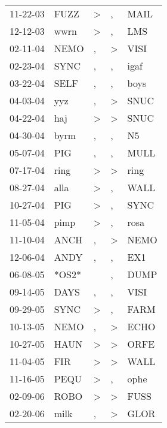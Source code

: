 \begin{supertabular}{lllll}
 11-22-03 &   FUZZ &     \textgreater &                , &   MAIL \\
 12-12-03 &   wwrn &     \textgreater &                , &    LMS \\
 02-11-04 &   NEMO &                , &     \textgreater &   VISI \\
 02-23-04 &   SYNC &                , &                , &   igaf \\
 03-22-04 &   SELF &                , &                , &   boys \\
 04-03-04 &    yyz &                , &     \textgreater &   SNUC \\
 04-22-04 &    haj &     \textgreater &     \textgreater &   SNUC \\
 04-30-04 &   byrm &                , &                , &     N5 \\
 05-07-04 &    PIG &                , &                , &   MULL \\
 07-17-04 &   ring &     \textgreater &     \textgreater &   ring \\
 08-27-04 &   alla &     \textgreater &                , &   WALL \\
 10-27-04 &    PIG &     \textgreater &                , &   SYNC \\
 11-05-04 &   pimp &     \textgreater &                , &   rosa \\
 11-10-04 &   ANCH &                , &     \textgreater &   NEMO \\
 12-06-04 &   ANDY &                , &                , &    EX1 \\
 06-08-05 &  *OS2* &                  &                , &   DUMP \\
 09-14-05 &   DAYS &                , &                , &   VISI \\
 09-29-05 &   SYNC &     \textgreater &                , &   FARM \\
 10-13-05 &   NEMO &                , &     \textgreater &   ECHO \\
 10-27-05 &   HAUN &     \textgreater &     \textgreater &   ORFE \\
 11-04-05 &    FIR &     \textgreater &     \textgreater &   WALL \\
 11-16-05 &   PEQU &     \textgreater &                , &   ophe \\
 02-09-06 &   ROBO &     \textgreater &     \textgreater &   FUSS \\
 02-20-06 &   milk &                , &     \textgreater &   GLOR \\

\end{supertabular}
